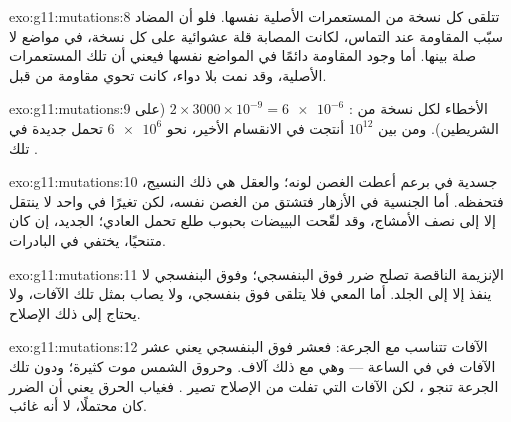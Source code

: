 \begin{solution}{exo:g11:mutations:8}
تتلقى كل نسخة  من المستعمرات الأصلية نفسها. فلو أن المضاد سبّب
المقاومة عند التماس، لكانت  المصابة قلة عشوائية على كل نسخة، في
مواضع لا صلة بينها. أما وجود المقاومة دائمًا في المواضع نفسها فيعني أن
تلك المستعمرات الأصلية، وقد نمت بلا دواء، كانت تحوي  مقاومة من
قبل.
\end{solution}

\begin{solution}{exo:g11:mutations:9}
الأخطاء لكل نسخة من : $2 \times 3000 \times 10^{-9} =
\num{6e-6}$ (على الشريطين). ومن بين $10^{12}$  أنتجت في الانقسام
الأخير، نحو $\num{6e6}$ تحمل  جديدة في تلك .
\end{solution}

\begin{solution}{exo:g11:mutations:10}
 جسدية في  برعم أعطت الغصن لونه؛ والعقل هي ذلك النسيج، فتحفظه.
أما  الجنسية في الأزهار فتشتق من الغصن نفسه، لكن تغيرًا في 
واحد لا ينتقل إلا إلى نصف الأمشاج، وقد لقّحت البييضات بحبوب طلع تحمل
 العادي؛  الجديد، إن كان متنحيًا، يختفي في البادرات.
\end{solution}

\begin{solution}{exo:g11:mutations:11}
الإنزيمة الناقصة تصلح ضرر فوق البنفسجي؛ وفوق البنفسجي لا ينفذ إلا إلى
الجلد. أما المعي فلا يتلقى فوق بنفسجي، ولا يصاب بمثل تلك الآفات، ولا
يحتاج إلى ذلك الإصلاح.
\end{solution}

\begin{solution}{exo:g11:mutations:12}
الآفات تتناسب مع الجرعة: فعشر فوق البنفسجي يعني عشر الآفات في 
في الساعة --- وهي مع ذلك آلاف. وحروق الشمس موت  كثيرة؛ ودون تلك
الجرعة تنجو ، لكن الآفات التي تفلت من الإصلاح تصير . فغياب
الحرق يعني أن الضرر كان محتملًا، لا أنه غائب.
\end{solution}

